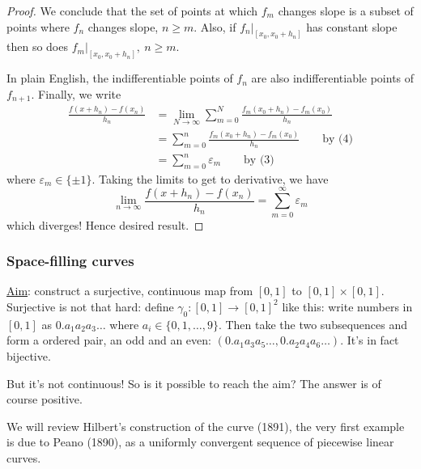 \documentclass[a4paper]{article}
\theoremstyle{definition}
\begin{document}
\begin{proof}
We conclude that the set of points at which $f_m$ changes slope is a subset of points where $f_n$ changes slope, $n\geq m$. Also, if $f_n\left. \right|_{[x_0,x_0+h_n]}$ has constant slope then so does $f_m\left. \right|_{[x_0,x_0+h_n]}, \ n\geq m$.

In plain English, the indifferentiable points of $f_n$ are also indifferentiable points of $f_{n+1}$. Finally, we write
\[
\begin{aligned}
\frac{f(x+h_n)-f(x_n)}{h_n} &= \lim_{N\rightarrow \infty} \sum_{m=0}^N \frac{f_m (x_0+h_n)-f_m(x_0)}{h_n} \\&= \sum_{m=0}^n \frac{f_m (x_0+h_n)-f_m(x_0)}{h_n} \qquad \text{by (4)} \\&= \sum_{m=0}^n \varepsilon_m \qquad \text{by (3)}
\end{aligned}
\]
where $\varepsilon_m\in \{\pm 1\}$. Taking the limits to get to derivative, we have
\[
\lim_{n\rightarrow \infty} \frac{f(x+h_n)-f(x_n)}{h_n} = \sum_{m=0}^\infty \varepsilon_m
\]
which diverges! Hence desired result.
\end{proof}

\subsubsection{Space-filling curves}
\underline{Aim}: construct a surjective, continuous map from $[0,1]$ to $[0,1]\times [0,1]$. \\

Surjective is not that hard: define $\gamma_0:[0,1]\rightarrow [0,1]^2$ like this: write numbers in $[0,1]$ as $0.a_1 a_2 a_3\ldots$ where $a_i\in \{0,1,\ldots,9\}$. Then take the two subsequences and form a ordered pair, an odd and an even: $(0.a_1a_3a_5\ldots, 0.a_2a_4a_6\ldots )$. It's in fact bijective.

But it's not continuous! So is it possible to reach the aim? The answer is of course positive.

We will review Hilbert's construction of the curve (1891), the very first example is due to Peano (1890), as a uniformly convergent sequence of piecewise linear curves.
\end{document}
